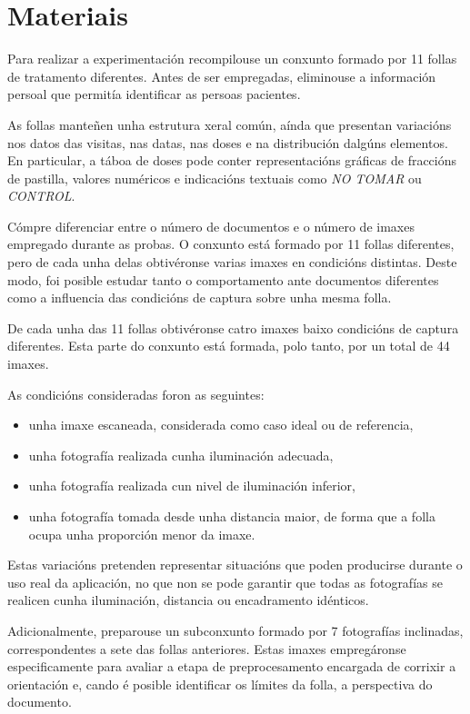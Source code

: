 \section{Materiais}
\label{sec:materiais-procesamento}

Para realizar a experimentación recompilouse un conxunto formado por 11 follas de tratamento diferentes. Antes de ser empregadas, eliminouse a información persoal que permitía identificar as persoas pacientes.

As follas manteñen unha estrutura xeral común, aínda que presentan variacións nos datos das visitas, nas datas, nas doses e na distribución dalgúns elementos. En particular, a táboa de doses pode conter representacións gráficas de fraccións de pastilla, valores numéricos e indicacións textuais como \textit{NO TOMAR} ou \textit{CONTROL}.

Cómpre diferenciar entre o número de documentos e o número de imaxes empregado durante as probas. O conxunto está formado por 11 follas diferentes, pero de cada unha delas obtivéronse varias imaxes en condicións distintas. Deste modo, foi posible estudar tanto o comportamento ante documentos diferentes como a influencia das condicións de captura sobre unha mesma folla.

De cada unha das 11 follas obtivéronse catro imaxes baixo condicións de captura diferentes. Esta parte do conxunto está formada, polo tanto, por un total de 44 imaxes.

As condicións consideradas foron as seguintes:

\begin{itemize}
    \item unha imaxe escaneada, considerada como caso ideal ou de referencia,
    \item unha fotografía realizada cunha iluminación adecuada,
    \item unha fotografía realizada cun nivel de iluminación inferior,
    \item unha fotografía tomada desde unha distancia maior, de forma que a folla ocupa unha proporción menor da imaxe.
\end{itemize}

Estas variacións pretenden representar situacións que poden producirse durante o uso real da aplicación, no que non se pode garantir que todas as fotografías se realicen cunha iluminación, distancia ou encadramento idénticos.

Adicionalmente, preparouse un subconxunto formado por 7 fotografías inclinadas, correspondentes a sete das follas anteriores. Estas imaxes empregáronse especificamente para avaliar a etapa de preprocesamento encargada de corrixir a orientación e, cando é posible identificar os límites da folla, a perspectiva do documento.

